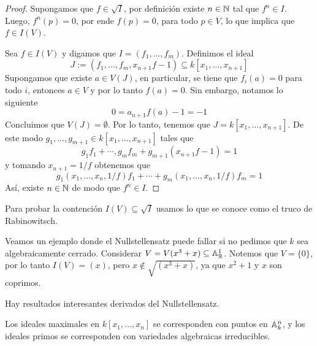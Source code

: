 \documentclass[11pt]{article}
\begin{document}
\vspace{2mm}
\begin{proof}
    Supongamos que $f\in\sqrt{I}$, por definición existe $n\in\mathbb{N}$ tal que $f^{n}\in I$. Luego,
    $f^{n}(p)=0$, por ende $f(p)=0$, para todo $p\in V$, lo que implica que $f\in I(V)$.

    \vspace{1mm}
    Sea $f\in I(V)$ y digamos que $I=(f_{1},\dots,f_{m})$. Definimos el ideal
    \begin{equation*}
        J:=(f_{1},\dots,f_{m},x_{n+1}f-1)\subseteq k[x_{1},\dots,x_{n+1}]
    \end{equation*}
    Supongamos que existe $a\in V(J)$, en particular, se tiene que $f_{i}(a)=0$ para todo $i$, 
    entonces $a\in V$ y por lo tanto $f(a)=0$. Sin embargo, notamos lo siguiente
    \begin{equation*}
        0=a_{n+1}f(a)-1=-1
    \end{equation*}
    Concluimos que $V(J)=\emptyset$. Por lo tanto, tenemos que $J=k[x_{1},\dots,x_{n+1}]$. De este
    modo $g_{1},\dots,g_{m+1}\in k[x_{1},\dots,x_{n+1}]$ tales que
    \begin{equation*}
        g_{1}f_{1}+\cdots,g_{m}f_{m}+g_{m+1}(x_{n+1}f-1)=1
    \end{equation*}
    y tomando $x_{n+1}=1/f$ obtenemos que
    \begin{equation*}
        g_{1}(x_{1},\dots,x_{n},1/f)f_{1}+\cdots+g_{m}(x_{1},\dots,x_{n},1/f)f_{m}=1
    \end{equation*}
    Así, existe $n\in\mathbb{N}$ de modo que $f^{n}\in I$.
\end{proof}

\noindent Para probar la contención $I(V)\subseteq\sqrt{I}$ usamos lo que se conoce como el truco 
de Rabinowitsch.

\begin{ejm}
    Veamos un ejemplo donde el Nullstellensatz puede fallar si no pedimos que $k$ sea 
    algebraicamente cerrado. Considerar $V=V(x^{3}+x)\subseteq\mathbb{A}_{\mathbb{R}}^{1}$. Notemos que $V=\{0\}$,
    por lo tanto $I(V)=(x)$, pero $x\not\in\sqrt{(x^{3}+x)}$, ya que $x^{2}+1$ y $x$ son coprimos.
\end{ejm}

\noindent Hay resultados interesantes derivados del Nullstellensatz.

\begin{cor}
    Los ideales maximales en $k[x_{1},\dots,x_{n}]$ se corresponden con puntos en $\mathbb{A}_{k}^{n}$, y
    los ideales primos se corresponden con variedades algebraicas irreducibles.
\end{cor}
\end{document}
